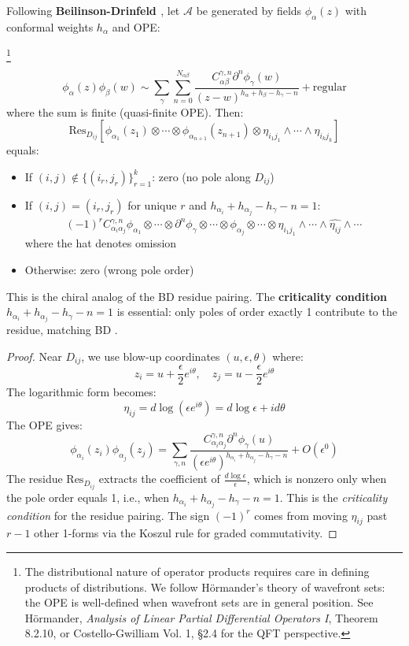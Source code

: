 \begin{theorem}\label{thm:residue-formula}
Following \textbf{Beilinson-Drinfeld \cite[§3.7.4, p.228]{BD04}}, 
let $\mathcal{A}$ be generated by fields $\phi_\alpha(z)$ with conformal weights $h_\alpha$ and OPE:

\footnote{The distributional nature of operator products requires care in defining 
products of distributions. We follow Hörmander's theory of wavefront sets: the OPE 
is well-defined when wavefront sets are in general position. See Hörmander, 
\textit{Analysis of Linear Partial Differential Operators I}, Theorem 8.2.10, or 
Costello-Gwilliam Vol. 1, \S2.4 for the QFT perspective.}

\[
\phi_\alpha(z)\phi_\beta(w) \sim \sum_{\gamma} \sum_{n=0}^{N_{\alpha\beta}} 
\frac{C^{\gamma,n}_{\alpha\beta} \partial^n\phi_\gamma(w)}{(z-w)^{h_\alpha + h_\beta - h_\gamma - n}}
+ \text{regular}
\]
where the sum is finite (quasi-finite OPE). Then:
\[
\text{Res}_{D_{ij}}[\phi_{\alpha_1}(z_1) \otimes \cdots \otimes \phi_{\alpha_{n+1}}(z_{n+1}) 
\otimes \eta_{i_1j_1} \wedge \cdots \wedge \eta_{i_kj_k}]
\]
equals:
\begin{itemize}
\item If $(i,j) \notin \{(i_r, j_r)\}_{r=1}^k$: zero (no pole along $D_{ij}$)
\item If $(i,j) = (i_r, j_r)$ for unique $r$ and $h_{\alpha_i} + h_{\alpha_j} - h_\gamma - n = 1$:
\[
(-1)^r C^{\gamma,n}_{\alpha_i\alpha_j} \phi_{\alpha_1} \otimes \cdots \otimes \partial^n\phi_\gamma \otimes \cdots 
\otimes \widehat{\phi_{\alpha_j}} \otimes \cdots \otimes \eta_{i_1j_1} \wedge \cdots \wedge \widehat{\eta_{ij}} \wedge \cdots
\]
where the hat denotes omission
\item Otherwise: zero (wrong pole order)
\end{itemize}

This is the chiral analog of the BD residue pairing. The \textbf{criticality condition} 
$h_{\alpha_i} + h_{\alpha_j} - h_\gamma - n = 1$ is essential: only poles of order exactly 1 
contribute to the residue, matching BD \cite[§3.7.4]{BD04}.
\end{theorem}
 
\begin{proof}
Near $D_{ij}$, we use blow-up coordinates $(u, \epsilon, \theta)$ where:
\[
z_i = u + \frac{\epsilon}{2}e^{i\theta}, \quad z_j = u - \frac{\epsilon}{2}e^{i\theta}
\]
The logarithmic form becomes:
\[
\eta_{ij} = d\log(\epsilon e^{i\theta}) = d\log\epsilon + id\theta
\]
The OPE gives:
\[
\phi_{\alpha_i}(z_i)\phi_{\alpha_j}(z_j) = \sum_{\gamma,n} 
\frac{C^{\gamma,n}_{\alpha_i\alpha_j} \partial^n\phi_\gamma(u)}{(\epsilon e^{i\theta})^{h_{\alpha_i} + h_{\alpha_j} - h_\gamma - n}}
+ O(\epsilon^0)
\]
The residue $\text{Res}_{D_{ij}}$ extracts the coefficient of $\frac{d\log\epsilon}{\epsilon}$, which is 
nonzero only when the pole order equals 1, i.e., when $h_{\alpha_i} + h_{\alpha_j} - h_\gamma - n = 1$. This is the 
\emph{criticality condition} for the residue pairing. The sign $(-1)^r$ comes from 
moving $\eta_{ij}$ past $r-1$ other 1-forms via the Koszul rule for graded
commutativity.
\end{proof}
 
